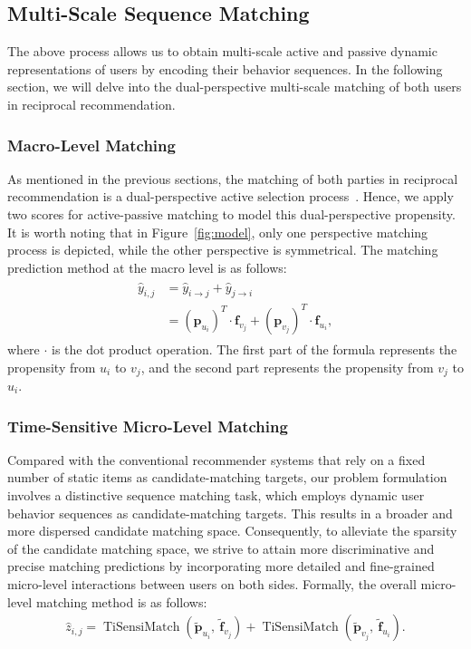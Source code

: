 \subsection{Multi-Scale Sequence Matching} \label{sec:match}
The above process allows us to obtain multi-scale active and passive dynamic representations of users by encoding their behavior sequences. In the following section, we will delve into the dual-perspective multi-scale matching of both users in reciprocal recommendation.
\subsubsection{Macro-Level Matching}
As mentioned in the previous sections, the matching of both parties in reciprocal recommendation is a dual-perspective active selection process~\cite{pizzato2010recon,xia2015reciprocal,neve2019latent,yang2022modeling}. Hence, we apply two scores for active-passive matching to model this dual-perspective propensity. It is worth noting that in Figure~\ref{fig:model}, only one perspective matching process is depicted, while the other perspective is symmetrical. The matching prediction method at the macro level is as follows:
\begin{align}
\begin{split}
    {\hat{y}}_{i,j} & = {\hat{y}}_{i \rightarrow j} + {\hat{y}}_{j \rightarrow i}\\
    &= (\bm{p}_{u_i})^{T} \cdot \bm{f}_{v_j} + (\bm{p}_{v_j})^{T} \cdot \bm{f}_{u_i},
\end{split}
\label{eq:ma_score}
\end{align}
where $\cdot$ is the dot product operation. The first part of the formula represents the propensity from $u_i$ to $v_j$, and the second part represents the propensity from $v_j$ to $u_i$.
\subsubsection{Time-Sensitive Micro-Level Matching}
Compared with the conventional recommender systems that rely on a fixed number of static items as candidate-matching targets, our problem formulation involves a distinctive sequence matching task, which employs dynamic user behavior sequences as candidate-matching targets. This results in a broader and more dispersed candidate matching space. 
Consequently, to alleviate the sparsity of the candidate matching space, we strive to attain more discriminative and precise matching predictions by incorporating more detailed and fine-grained micro-level interactions between users on both sides. 
Formally, the overall micro-level matching method is as follows:
\begin{align}
    {\hat{z}}_{i,j} = \operatorname{TiSensiMatch} \left(\widetilde{\bm{p}}_{u_i}, \ \widetilde{\bm{f}}_{v_j}\right) + \operatorname{TiSensiMatch} \left(\widetilde{\bm{p}}_{v_j}, \  \widetilde{\bm{f}}_{u_i}\right).
    \label{eq:mi_score}
\end{align}

